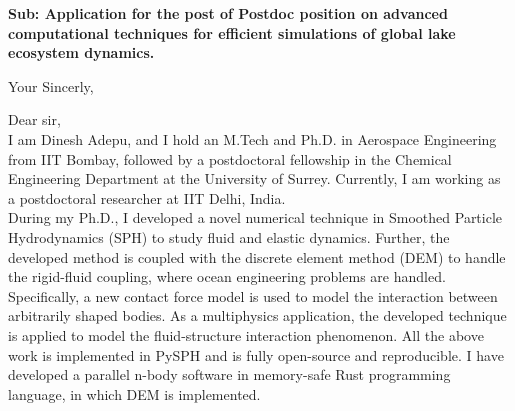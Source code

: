 \documentclass[11pt,a4paper,roman]{moderncv}
\begin{document}
\date{\today}
\opening{\textbf{Sub: Application for the post of Postdoc position on advanced computational techniques for efficient simulations of global lake ecosystem dynamics.}}
\closing{Your Sincerly, \vspace{-1em}}


\makelettertitle



Dear sir,
\\
\vspace{1em}
I am Dinesh Adepu, and I hold an M.Tech and Ph.D. in Aerospace
Engineering from IIT Bombay, followed by a postdoctoral fellowship in
the Chemical Engineering Department at the University of
Surrey. Currently, I am working as a postdoctoral researcher at IIT
Delhi, India. \\

\vspace{1em}
During my Ph.D., I developed a novel numerical technique in Smoothed
Particle Hydrodynamics (SPH) to study fluid and elastic dynamics.
Further, the developed method is coupled with the discrete element
method (DEM) to handle the rigid-fluid coupling, where ocean
engineering problems are handled.  Specifically, a new contact force
model is used to model the interaction between arbitrarily shaped
bodies. As a multiphysics application, the developed technique is
applied to model the fluid-structure interaction phenomenon. All the
above work is implemented in PySPH and is fully open-source and
reproducible. I have developed a parallel n-body software in
memory-safe Rust programming language, in which DEM is implemented. \\
\end{document}
